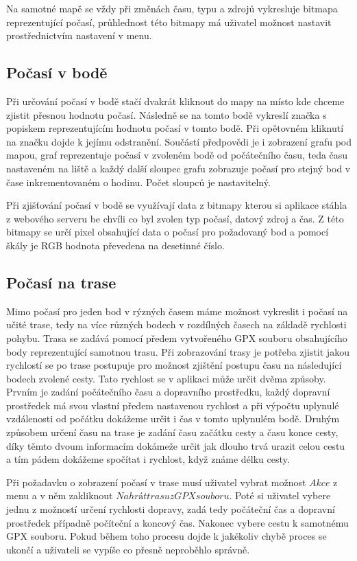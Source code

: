 \documentclass[czech,bachelor,dept460,male,csharp,cpdeclaration]{diploma}
\begin{document}
	Na samotné mapě se vždy při změnách času, typu a zdrojů vykresluje bitmapa reprezentující počasí, průhlednost této bitmapy má uživatel možnost nastavit prostřednictvím nastavení v menu.
	
	\subsection{Počasí v bodě}
	
	Při určování počasí v bodě stačí dvakrát kliknout do mapy na místo kde chceme zjistit přesnou hodnotu počasí. Následně se na tomto bodě vykreslí značka s popiskem reprezentujícím hodnotu počasí v tomto bodě. Při opětovném kliknutí na značku dojde k jejímu odstranění. Součástí předpovědi je i zobrazení grafu pod mapou, graf reprezentuje počasí v zvoleném bodě od počátečního času, teda času nastaveném na liště a každý další sloupec grafu zobrazuje počasí pro stejný bod v čase inkrementovaném o hodinu. Počet sloupců je nastavitelný.
	
	Při zjišťování počasí v bodě se využívají data z bitmapy kterou si aplikace stáhla z webového serveru be chvíli co byl zvolen typ počasí, datový zdroj a čas. Z této bitmapy se určí pixel obsahující data o počasí pro požadovaný bod a pomocí škály je RGB hodnota převedena na desetinné číslo.
	
	\subsection{Počasí na trase}
	
	Mimo počasí pro jeden bod v rýzných časem máme možnost vykreslit i počasí na učité trase, tedy na více různých bodech v rozdílných časech na základě rychlosti pohybu. Trasa se zadává pomocí předem vytvořeného GPX souboru obsahujícího body reprezentující samotnou trasu. Při zobrazování trasy je potřeba zjistit jakou rychlostí se po trase postupuje pro možnost zjištění postupu času na následující bodech zvolené cesty. Tato rychlost se v aplikaci může určit dvěma způsoby. Prvním je zadání počátečního času a dopravního prostředku, každý dopravní prostředek má svou vlastní předem nastavenou rychlost a při výpočtu uplynulé vzdálenosti od počátku dokážeme určit i čas v tomto uplynulém bodě. Druhým způsobem určení času na trase je zadání času začátku cesty a času konce cesty, díky těmto dvoum informacím dokámeže určit jak dlouho trvá urazit celou cestu a tím pádem dokážeme spočítat i rychlost, když známe délku cesty.
	
	Při požadavku o zobrazení počasí v trase musí uživatel vybrat možnost $Akce$ z menu a v něm zakliknout $Nahrát trasu z GPX souboru$. Poté si uživatel vybere jednu z možností určení rychlosti dopravy, zadá tedy počáteční čas a dopravní prostředek případně počíteční a koncový čas. Nakonec vybere cestu k samotnému GPX souboru. Pokud během toho procesu dojde k jakékoliv chybě proces se ukončí a uživateli se vypíše co přesně neproběhlo správně.
	
\end{document}

